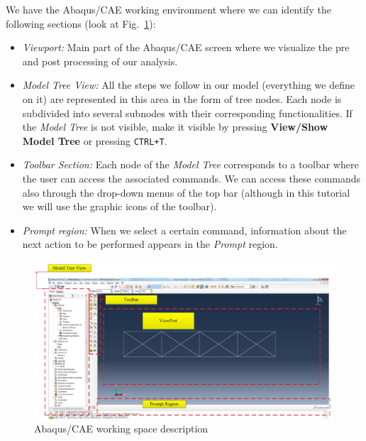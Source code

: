 We have the Abaqus/CAE working environment where we can identify the
following sections (look at Fig.~\ref{figu11}):
\begin{itemize}
\item \textit{Viewport:} Main part of the Abaqus/CAE screen where we
  visualize the pre and post processing of our analysis.
\item \textit{Model Tree View:} All the steps we follow in our model
  (everything we define on it) are represented in this area in the
  form of tree nodes. Each node is subdivided into several subnodes
  with their corresponding functionalities.  If the \textit{Model
    Tree} is not visible, make it visible by pressing
  \textbf{View/Show Model Tree} or pressing \texttt{CTRL+T}.
\item \textit{Toolbar Section:} Each node of the \textit{Model Tree}
  corresponds to a toolbar where the user can access the associated
  commands. We can access these commands also through the drop-down
  menus of the top bar (although in this tutorial we will use the
  graphic icons of the toolbar).
\item \textit{Prompt region:} When we select a certain command,
  information about the next action to be performed appears in the
  \textit{Prompt} region.
\end{itemize}

\begin{figure}[!h]
  \begin{center}
    \includegraphics[width=1.05\textwidth]{./body/images/imagen11}
  \end{center}
  \caption{Abaqus/CAE working space description}
  \label{figu11}
\end{figure}




